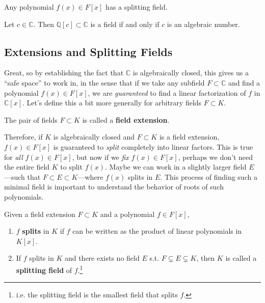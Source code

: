   \begin{corollary}
    Any polynomial $f(x) \in F[x]$ has a splitting field. 
  \end{corollary}

  \begin{corollary}
    Let $c \in \mathbb{C}$. Then $\mathbb{Q}[c] \subset \mathbb{C}$ is a field if and only if $c$ is an algebraic number. 
  \end{corollary}

\subsection{Extensions and Splitting Fields} 

  Great, so by establishing the fact that $\mathbb{C}$ is algebraically closed, this gives us a ``safe space'' to work in, in the sense that if we take any subfield $F \subset \mathbb{C}$ and find a polynomial $f(x) \in F[x]$, we are \textit{guaranteed} to find a linear factorization of $f$ in $\mathbb{C}[x]$. Let's define this a bit more generally for arbitrary fields $F \subset K$. 

  \begin{definition}
    The pair of fields $F \subset K$ is called a \textbf{field extension}. 
  \end{definition}

  Therefore, if $K$ is algebraically closed and $F \subset K$ is a field extension, $f(x) \in F[x]$ is guaranteed to \textit{split} completely into linear factors. This is true for \textit{all} $f(x) \in F[x]$, but now if we \textit{fix} $f(x) \in F[x]$, perhaps we don't need the entire field $K$ to split $f(x)$. Maybe we can work in a slightly larger field $E$---such that $F \subset E \subset K$---where $f(x)$ splits in $E$. This process of finding such a minimal field is important to understand the behavior of roots of such polynomials. 

  \begin{definition}
    Given a field extension $F \subset K$ and a polynomial $f \in F[x]$, 
    \begin{enumerate}
      \item $f$ \textbf{splits} in $K$ if $f$ can be written as the product of linear polynomials in $K[x]$. 
      \item If $f$ splits in $K$ and there exists no field $E$ s.t. $F \subsetneq E \subsetneq K$, then $K$ is called a \textbf{splitting field} of $f$.\footnote{i.e. the splitting field is the smallest field that splits $f$.} 
    \end{enumerate}
  \end{definition}

